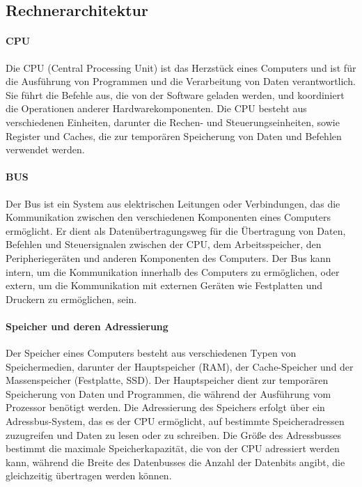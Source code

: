 \subsection{Rechnerarchitektur}
\label{sec:Rechnerarchitektur}

\paragraph{CPU}

Die CPU (Central Processing Unit) ist das Herzstück eines Computers und ist für die Ausführung von Programmen und die Verarbeitung von Daten verantwortlich. Sie führt die Befehle aus, die von der Software geladen werden, und koordiniert die Operationen anderer Hardwarekomponenten. Die CPU besteht aus verschiedenen Einheiten, darunter die Rechen- und Steuerungseinheiten, sowie Register und Caches, die zur temporären Speicherung von Daten und Befehlen verwendet werden.

\paragraph{BUS}

Der Bus ist ein System aus elektrischen Leitungen oder Verbindungen, das die Kommunikation zwischen den verschiedenen Komponenten eines Computers ermöglicht. Er dient als Datenübertragungsweg für die Übertragung von Daten, Befehlen und Steuersignalen zwischen der CPU, dem Arbeitsspeicher, den Peripheriegeräten und anderen Komponenten des Computers. Der Bus kann intern, um die Kommunikation innerhalb des Computers zu ermöglichen, oder extern, um die Kommunikation mit externen Geräten wie Festplatten und Druckern zu ermöglichen, sein.

\paragraph{Speicher und deren Adressierung}

Der Speicher eines Computers besteht aus verschiedenen Typen von Speichermedien, darunter der Hauptspeicher (RAM), der Cache-Speicher und der Massenspeicher (Festplatte, SSD). Der Hauptspeicher dient zur temporären Speicherung von Daten und Programmen, die während der Ausführung vom Prozessor benötigt werden. Die Adressierung des Speichers erfolgt über ein Adressbus-System, das es der CPU ermöglicht, auf bestimmte Speicheradressen zuzugreifen und Daten zu lesen oder zu schreiben. Die Größe des Adressbusses bestimmt die maximale Speicherkapazität, die von der CPU adressiert werden kann, während die Breite des Datenbusses die Anzahl der Datenbits angibt, die gleichzeitig übertragen werden können.
